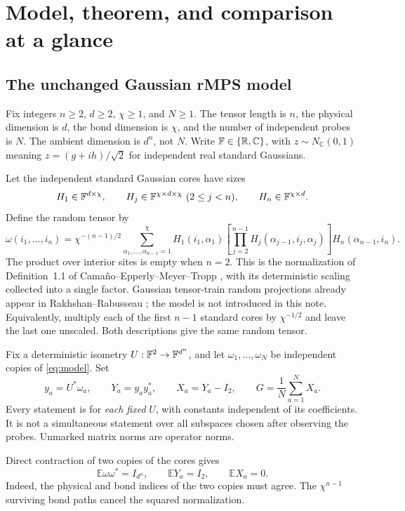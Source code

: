 \documentclass[11pt]{article}
\numberwithin{equation}{section}
\theoremstyle{definition}\newtheorem{definition}[theorem]{Definition}
\theoremstyle{remark}\newtheorem{remark}[theorem]{Remark}
\newcommand{\R}{\mathbb R}\newcommand{\E}{\mathbb E}\newcommand{\Prob}{\mathbb P}
\newcommand{\C}{\mathbb C}
\begin{document}
\section{Model, theorem, and comparison at a glance}\label{sec:model}
\subsection{The unchanged Gaussian rMPS model}
Fix integers $n\ge2$, $d\ge2$, $\chi\ge1$, and $N\ge1$. The tensor length is $n$,
the physical dimension is $d$, the bond dimension is $\chi$, and the number of
independent probes is $N$. The ambient dimension is $d^n$, not $N$.
Write $\F\in\{\R,\C\}$, with $z\sim N_{\C}(0,1)$ meaning
$z=(g+ih)/\sqrt2$ for independent real standard Gaussians.

Let the independent standard Gaussian cores have sizes
\[
 H_1\in\mathbb F^{d\times\chi},\qquad
 H_j\in\mathbb F^{\chi\times d\times\chi}\ (2\le j<n),\qquad
 H_n\in\mathbb F^{\chi\times d}.
\]
Define the random tensor by
\begin{equation}\label{eq:model}
 \omega(i_1,\ldots,i_n)=\chi^{-(n-1)/2}
 \sum_{\alpha_1,\ldots,\alpha_{n-1}=1}^{\chi}
 H_1(i_1,\alpha_1)
 \left[\prod_{j=2}^{n-1}H_j(\alpha_{j-1},i_j,\alpha_j)\right]
 H_n(\alpha_{n-1},i_n).
\end{equation}
The product over interior sites is empty when $n=2$.
This is the normalization of Definition~1.1 of Cama\~no--Epperly--Meyer--Tropp
\cite{CEMT}, with its deterministic scaling collected into a single factor.
Gaussian tensor-train random projections already appear in Rakhshan--Rabusseau
\cite{RR2020}; the model is not introduced in this note.
Equivalently, multiply each of the first $n-1$ standard cores by $\chi^{-1/2}$
and leave the last one unscaled. Both descriptions give the same random tensor.

Fix a deterministic isometry $U:\mathbb F^2\to\mathbb F^{d^n}$, and let $\omega_1,\ldots,\omega_N$
be independent copies of \eqref{eq:model}. Set
\begin{equation}\label{eq:G}
 y_a=U^*\omega_a,\qquad Y_a=y_ay_a^*,\qquad X_a=Y_a-I_2,
 \qquad G=\frac1N\sum_{a=1}^N X_a.
\end{equation}
Every statement is for \emph{each fixed} $U$, with constants independent of its
coefficients. It is not a simultaneous statement over all subspaces chosen after
observing the probes. Unmarked matrix norms are operator norms.

Direct contraction of two copies of the cores gives
\begin{equation}\label{eq:isotropy}
 \E\omega\omega^*=I_{d^n},\qquad \E Y_a=I_2,\qquad \E X_a=0.
\end{equation}
Indeed, the physical and bond indices of the two copies must agree. The
$\chi^{n-1}$ surviving bond paths cancel the squared normalization.
\end{document}
